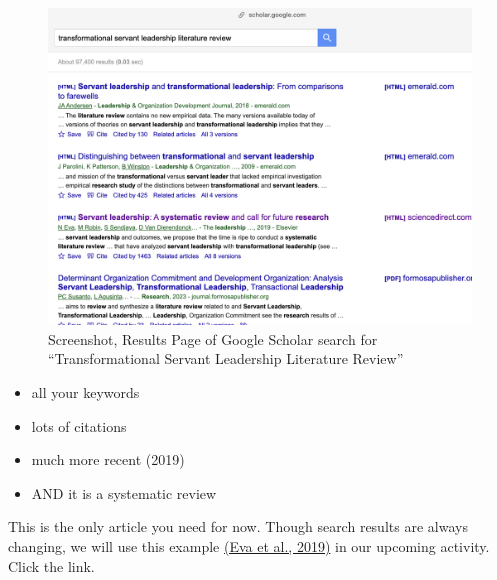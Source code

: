 \documentclass[
  letterpaper,
  DIV=11,
  numbers=noendperiod]{scrreprt}
\providecommand{\tightlist}{%
  \setlength{\itemsep}{0pt}\setlength{\parskip}{0pt}}\usepackage{longtable,booktabs,array}
\begin{document}
\begin{figure}

\caption{\label{fig-googlexsearch2}Screenshot, Results Page of Google
Scholar search for ``Transformational Servant Leadership Literature
Review''}

\includegraphics{assets/u2/google-search2.png}

\end{figure}%

\begin{itemize}
\tightlist
\item
  all your keywords
\item
  lots of citations
\item
  much more recent (2019)
\item
  AND it is a systematic review
\end{itemize}

This is the only article you need for now. Though search results are
always changing, we will use this example
\href{https://linkinghub.elsevier.com/retrieve/pii/S1048984317307774}{(Eva
et al., 2019)} in our upcoming activity. Click the link.
\end{document}
